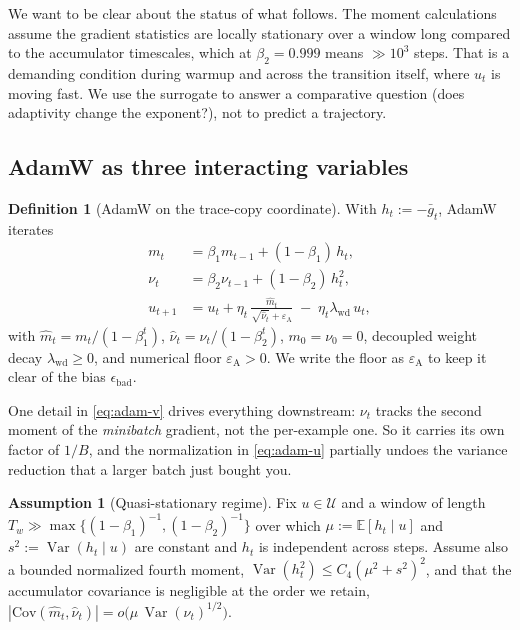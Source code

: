 \documentclass{article}
\theoremstyle{plain}
\theoremstyle{definition}
\newtheorem{definition}{Definition}
\newtheorem{assumption}{Assumption}
\theoremstyle{remark}
\newcommand{\E}{\mathbb{E}}
\newcommand{\Var}{\operatorname{Var}}
\newcommand{\1}{\mathbf{1}}
\newcommand{\cU}{\mathcal{U}}
\newcommand{\bad}{\mathrm{bad}}
\newcommand{\wdc}{\mathrm{wd}}
\begin{document}
We want to be clear about the status of what follows. The moment calculations
assume the gradient statistics are locally stationary over a window long compared
to the accumulator timescales, which at $\beta_2=0.999$ means $\gg10^3$ steps.
That is a demanding condition during warmup and across the transition itself,
where $u_t$ is moving fast. We use the surrogate to answer a comparative question
(does adaptivity change the exponent?), not to predict a trajectory.

\subsection{AdamW as three interacting variables}

\begin{definition}[AdamW on the trace-copy coordinate]
\label{def:adamw}
With $h_t := -\bar g_t$, AdamW iterates
\begin{align}
m_t &= \beta_1 m_{t-1} + (1-\beta_1)\,h_t, \label{eq:adam-m}\\
\nu_t &= \beta_2 \nu_{t-1} + (1-\beta_2)\,h_t^2, \label{eq:adam-v}\\
u_{t+1} &= u_t + \eta_t\,\frac{\hat m_t}{\sqrt{\hat\nu_t}+\varepsilon_{\mathrm A}}
           \;-\; \eta_t\lambda_\wdc\, u_t ,
\label{eq:adam-u}
\end{align}
with $\hat m_t = m_t/(1-\beta_1^t)$, $\hat\nu_t = \nu_t/(1-\beta_2^t)$,
$m_0 = \nu_0 = 0$, decoupled weight decay $\lambda_\wdc\ge0$, and numerical floor
$\varepsilon_{\mathrm A} > 0$. We write the floor as $\varepsilon_{\mathrm A}$ to
keep it clear of the bias $\epsilon_\bad$.
\end{definition}

One detail in \eqref{eq:adam-v} drives everything downstream: $\nu_t$ tracks the
second moment of the \emph{minibatch} gradient, not the per-example one. So it
carries its own factor of $1/B$, and the normalization in \eqref{eq:adam-u}
partially undoes the variance reduction that a larger batch just bought you.

\begin{assumption}[Quasi-stationary regime]
\label{ass:qs}
Fix $u\in\cU$ and a window of length
$T_w\gg\max\{(1-\beta_1)^{-1},(1-\beta_2)^{-1}\}$ over which
$\mu := \E[h_t\mid u]$ and $s^2 := \Var(h_t\mid u)$ are constant and $h_t$ is
independent across steps. Assume also a bounded normalized fourth moment,
$\Var(h_t^2)\le C_4(\mu^2+s^2)^2$, and that the accumulator covariance is
negligible at the order we retain,
$|\mathrm{Cov}(\hat m_t,\hat\nu_t)| = o\big(\mu\,\Var(\hat\nu_t)^{1/2}\big)$.
\end{assumption}
\end{document}
